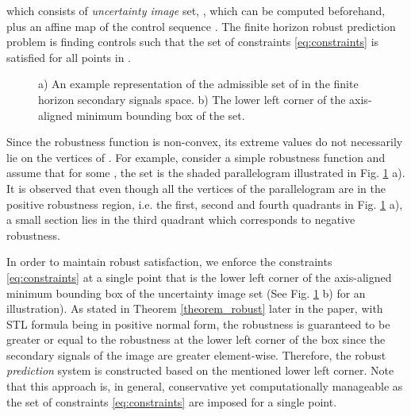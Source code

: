 \documentclass[letterpaper, 10 pt, conference]{ieeeconf}
\begin{document}
which consists of \emph{uncertainty image} set, , which can be computed beforehand, plus an affine map of the control sequence . The finite horizon robust prediction problem is finding controls  such that the set of constraints \eqref{eq:constraints} is satisfied for all points in . 
\begin{figure}[t]
\centering
{}
\caption{a) An example representation of the admissible set of  in the finite horizon secondary signals space. b) The lower left corner of the axis-aligned minimum bounding box of the set. }
\label{fig:shaded}
\end{figure}
Since the robustness function is non-convex, its extreme values do not necessarily lie on the vertices of . For example,
consider a simple robustness function  and assume that for some , the set  is the shaded parallelogram illustrated in Fig. \ref{fig:shaded} a). It is observed that even though all the vertices of the parallelogram are in the positive robustness region, i.e. the first, second and fourth quadrants in Fig. \ref{fig:shaded} a), a small section lies in the third quadrant which corresponds to negative robustness. 

In order to maintain robust satisfaction, we enforce the constraints \eqref{eq:constraints} at a single point that is the lower left corner of the axis-aligned minimum bounding box of the uncertainty image set (See Fig. \ref{fig:shaded} b) for an illustration).
As stated in Theorem \ref{theorem_robust} later in the paper, with STL formula being in positive normal form, the robustness is guaranteed to be greater or equal to the robustness at the lower left corner of the box since the secondary signals of the image are greater element-wise. Therefore, the robust \emph{prediction} system is constructed based on the mentioned lower left corner. Note that this approach is, in general, conservative yet computationally manageable as the set of constraints \eqref{eq:constraints} are imposed for a single point.
\end{document}
